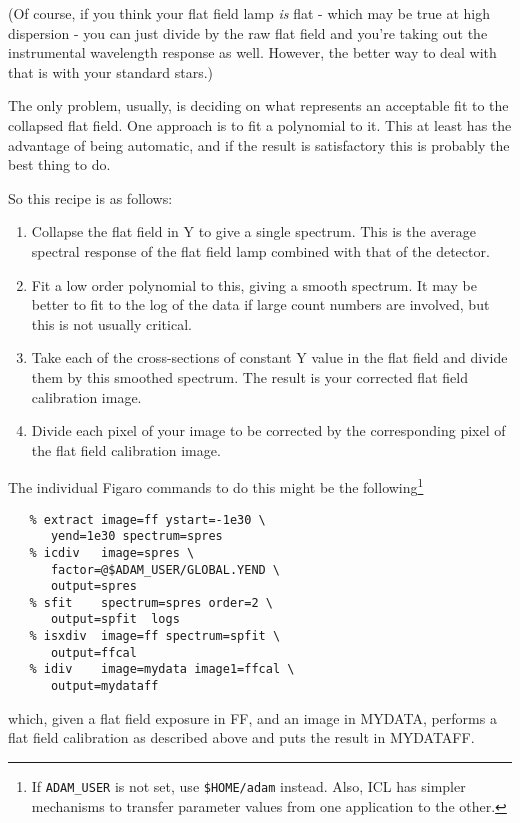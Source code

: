 (Of course, if you think your flat field lamp {\it is} flat - which may be
true at high dispersion - you can just divide by the raw flat field and
you're taking out the instrumental wavelength response as well.  However,
the better way to deal with that is with your standard stars.)

The only problem, usually, is deciding on what represents an acceptable
fit to the collapsed flat field.  One approach is to fit a polynomial to
it.  This at least has the advantage of being automatic, and if the result
is satisfactory this is probably the best thing to do.

So this recipe is as follows:

\begin{enumerate}
\item Collapse the flat field in Y to give a single spectrum.  This is the
average spectral response of the flat field lamp combined with that of the
detector.
\item Fit a low order polynomial to this, giving a smooth spectrum.  It may be
better to fit to the log of the data if large count numbers are involved, but
this is not usually critical.
\item Take each of the cross-sections of constant Y value in the flat field
and divide them by this smoothed spectrum.  The result is your corrected
flat field calibration image.
\item Divide each pixel of your image to be corrected by the corresponding
pixel of the flat field calibration image.
\end{enumerate}

The individual Figaro commands to do this might be the following\footnote{
   If {\tt ADAM\_USER} is not set, use {\tt \$HOME/adam} instead.  Also,
   ICL has simpler mechanisms to transfer parameter values from one
   application to the other.}

\begin{verbatim}
   % extract image=ff ystart=-1e30 \
      yend=1e30 spectrum=spres
   % icdiv   image=spres \
      factor=@$ADAM_USER/GLOBAL.YEND \
      output=spres
   % sfit    spectrum=spres order=2 \
      output=spfit  logs
   % isxdiv  image=ff spectrum=spfit \
      output=ffcal
   % idiv    image=mydata image1=ffcal \
      output=mydataff
\end{verbatim}

which, given a flat field exposure in FF, and an image in MYDATA, performs
a flat field calibration as described above and puts the result in MYDATAFF.

